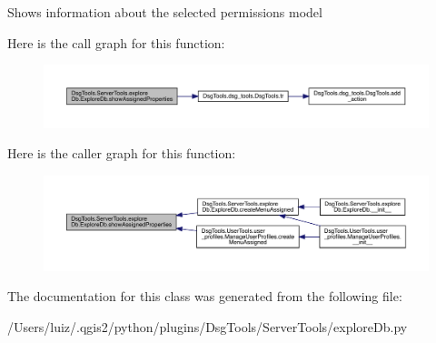 \begin{DoxyVerb}Shows information about the selected permissions model 
\end{DoxyVerb}
 Here is the call graph for this function\+:
\nopagebreak
\begin{figure}[H]
\begin{center}
\leavevmode
\includegraphics[width=350pt]{class_dsg_tools_1_1_server_tools_1_1explore_db_1_1_explore_db_a6294868955f1101541f57b97faeadbf3_cgraph}
\end{center}
\end{figure}
Here is the caller graph for this function\+:
\nopagebreak
\begin{figure}[H]
\begin{center}
\leavevmode
\includegraphics[width=350pt]{class_dsg_tools_1_1_server_tools_1_1explore_db_1_1_explore_db_a6294868955f1101541f57b97faeadbf3_icgraph}
\end{center}
\end{figure}


The documentation for this class was generated from the following file\+:\begin{DoxyCompactItemize}
\item 
/\+Users/luiz/.\+qgis2/python/plugins/\+Dsg\+Tools/\+Server\+Tools/explore\+Db.\+py\end{DoxyCompactItemize}
